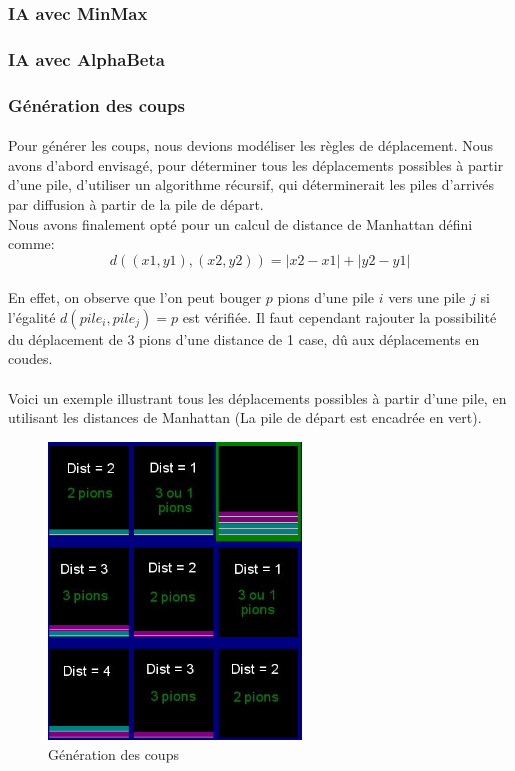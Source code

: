 \documentclass[article, backcover, french, nodocumentinfo]{upmethodology-document}
\begin{document}
			\subsubsection{IA avec MinMax}
			\subsubsection{IA avec AlphaBeta}
			\subsubsection{Génération des coups}\label{moveGeneration}
				\paragraph{}
					Pour générer les coups, nous devions modéliser les règles de déplacement. Nous avons d'abord envisagé, pour déterminer tous les déplacements possibles à partir d'une pile, d'utiliser un algorithme récursif, qui déterminerait les piles d'arrivés par diffusion à partir de la pile de départ.\\
					Nous avons finalement opté pour un calcul de distance de Manhattan défini comme:
					\[d((x1,y1),(x2,y2)) = |x2 - x1| + |y2 -y1|\]
				\paragraph{}
					En effet, on observe que l'on peut bouger $p$ pions d'une pile $i$ vers une pile $j$ si l'égalité $d(pile_{i}, pile_{j}) = p$ est vérifiée. Il faut cependant rajouter la possibilité du déplacement de 3 pions d'une distance de 1 case, dû aux déplacements en coudes.
				\paragraph{}
					Voici un exemple illustrant tous les déplacements possibles à partir d'une pile, en utilisant les distances de Manhattan (La pile de départ est encadrée en vert).
					\begin{figure}[H]
						\centering
						\includegraphics[width=0.6\textwidth]{figures/GenerationCoup}
						\caption{Génération des coups}
					\end{figure}
\end{document}
